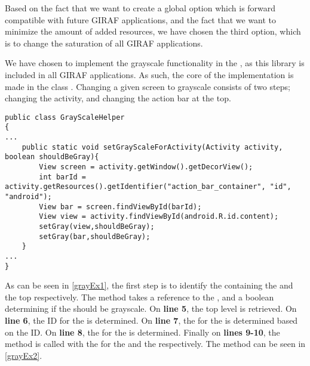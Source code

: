 Based on the fact that we want to create a global option which is forward
compatible with future GIRAF applications, and the fact that we want
to minimize the amount of added resources, we have chosen the third
option, which is to change the saturation of all GIRAF applications.\nl

We have chosen to implement the grayscale functionality in the \clib, as this
library is included in all GIRAF applications. As such, the core of the
implementation is made in the class . Changing a given
screen to grayscale consists of two steps; changing the activity, and changing
the action bar at the top.\nl

\begin{minipage}[H]{\linewidth}
\begin{lstlisting}[caption = Code used to determine the views for the activity and the top action bar., label = grayEx1] 
public class GrayScaleHelper
{
...
    public static void setGrayScaleForActivity(Activity activity, boolean shouldBeGray){
        View screen = activity.getWindow().getDecorView();
        int barId = activity.getResources().getIdentifier("action_bar_container", "id", "android");
        View bar = screen.findViewById(barId);
        View view = activity.findViewById(android.R.id.content);
        setGray(view,shouldBeGray);
        setGray(bar,shouldBeGray);
    }
...
}
\end{lstlisting}
\end{minipage}

As can be seen in \autoref{grayEx1}, the first step is to identify the
 containing the  and the top 
respectively. The method  takes a reference to
the , and a boolean determining if the  should
be grayscale. On \textbf{line 5}, the top level  is retrieved. On
\textbf{line 6}, the ID for the  is determined. On \textbf{line
7}, the  for the  is determined based on the ID. On
\textbf{line 8}, the  for the  is determined.
Finally on \textbf{lines 9-10}, the  method is called with the
 for the  and the  respectively.
The  method can be seen in \autoref{grayEx2}.\nl

